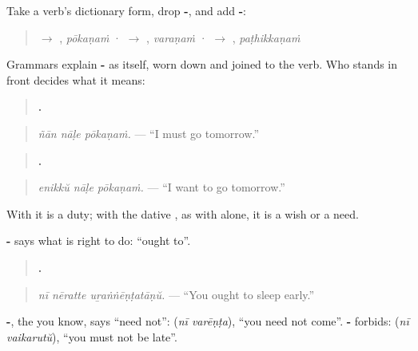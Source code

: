 \begin{grammarlens}[title={Grammar Lens: -\ml{അണം} on the verb}]
Take a verb's dictionary form, drop \textbf{-}, and add \textbf{-}:

\begin{quote}
 $\to$ \textbf{}, \emph{pōkaṇaṁ} ·  $\to$ \textbf{}, \emph{varaṇaṁ} ·  $\to$ \textbf{}, \emph{paṭhikkaṇaṁ}
\end{quote}

Grammars explain \textbf{-} as \textbf{} itself, worn down and joined to the verb. Who stands in front decides what it means:

\begin{quote}
\textbf{  .}
\end{quote}

\begin{quote}
\emph{ñān nāḷe pōkaṇaṁ.} — \textquotedblleft{}I must go tomorrow.\textquotedblright{}
\end{quote}

\begin{quote}
\textbf{  .}
\end{quote}

\begin{quote}
\emph{enikkŭ nāḷe pōkaṇaṁ.} — \textquotedblleft{}I want to go tomorrow.\textquotedblright{}
\end{quote}

With \textbf{} it is a duty; with the dative \textbf{}, as with \textbf{} alone, it is a wish or a need.
\end{grammarlens}

\begin{grammarlens}[title={Grammar Lens: ought to, need not, must not}]
\textbf{-} says what is right to do: \textquotedblleft{}ought to\textquotedblright{}.

\begin{quote}
\textbf{  .}
\end{quote}

\begin{quote}
\emph{nī nēratte uṟaṅṅēṇṭatāṇŭ.} — \textquotedblleft{}You ought to sleep early.\textquotedblright{}
\end{quote}

\textbf{-}, the \textbf{} you know, says \textquotedblleft{}need not\textquotedblright{}: \textbf{ } (\emph{nī varēṇṭa}), \textquotedblleft{}you need not come\textquotedblright{}. \textbf{-} forbids: \textbf{ } (\emph{nī vaikarutŭ}), \textquotedblleft{}you must not be late\textquotedblright{}.
\end{grammarlens}

